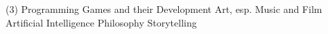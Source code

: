 



\begin{cventries}


\begin{tasks}[style=itemize, label-align=left, item-indent={10mm}](3)%
\task Programming
\task Games and their Development
\task Art, esp. Music and Film
\task Artificial Intelligence
\task Philosophy
\task Storytelling
\end{tasks}

%



\end{cventries}
